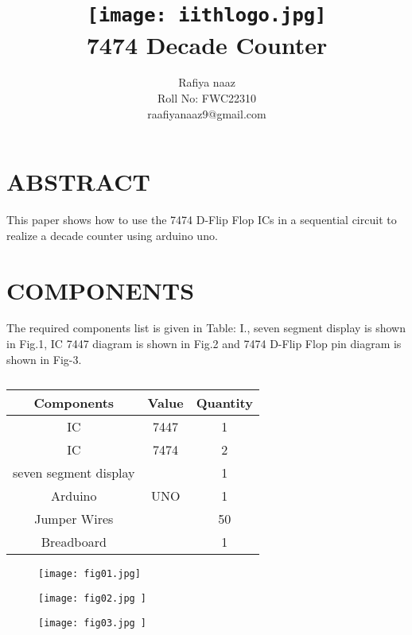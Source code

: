 \documentclass[conference]{IEEEtran}
\title{
\vspace{1cm}
{\texttt{[image:  iithlogo.jpg]} \\ 7474 Decade Counter} }
\author{Rafiya naaz \\ Roll No: FWC22310 \\ raafiyanaaz9@gmail.com}
\begin{document}
\maketitle
 \section {ABSTRACT}
 This paper shows how to use the 7474 D-Flip Flop ICs in a sequential circuit to realize a decade counter using arduino uno.

\section{COMPONENTS}
The required components list is given in Table: I., seven segment display is shown in Fig.1, IC 7447 diagram is shown in Fig.2 and 7474 D-Flip Flop pin diagram is shown in Fig-3.
\vspace{0.3cm}
 \begin{table} [htbp]
\centering
\begin{tabular}{| c | c | c |} \hline
Components & Value & Quantity \\\hline
IC & 7447 & 1 \\ \hline
IC & 7474 & 2 \\ \hline
seven segment display & & 1\\ \hline
Arduino & UNO & 1 \\ \hline
Jumper Wires &  & 50 \\ \hline
Breadboard & & 1 \\ 
\hline
\end{tabular}
\vspace{0.3cm}
\caption{\label{tab:widgets}}
\end{table}

\begin{figure}[h]                           
\centering                                 
\texttt{[image: fig01.jpg]}                                           
\caption{\label{fig-2:Gates}}               
\end{figure}
\begin{figure}[h]                           
\centering                            
\texttt{[image: fig02.jpg ]}                      
\caption{\label{fig-1:Gates}}           
\end{figure}

\begin{figure}[h]                           
\centering                                 
\texttt{[image: fig03.jpg  ]}                                           
\caption{\label{fig-3:Gates}}               
\end{figure}
\end{document}
